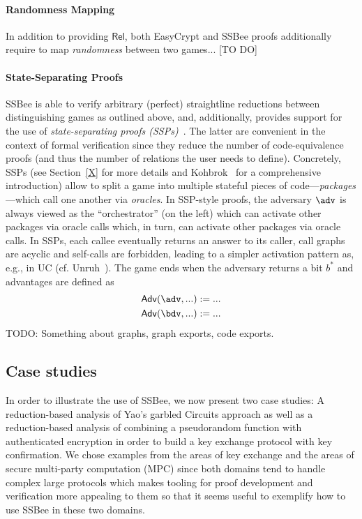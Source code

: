 \paragraph{Randomness Mapping}
In addition to providing $\mathsf{Rel}$, both EasyCrypt and SSBee proofs additionally require to
map \emph{randomness} between two games... [TO DO]

\paragraph{State-Separating Proofs}
SSBee is able to verify arbitrary (perfect) straightline reductions between distinguishing games as outlined above, and, additionally, provides support for the use of \emph{state-separating proofs (SSPs)}~\cite{X}. The latter are convenient in the context of formal verification since they reduce the
number of code-equivalence proofs (and thus the number of relations the user needs to define). Concretely, SSPs (see Section~\ref{X} for more details and Kohbrok~\cite{X} for a comprehensive introduction) allow to split a game into multiple stateful
pieces of code---\emph{packages}---which call one another via \emph{oracles}. In SSP-style proofs,
the adversary $\adv$ is always viewed as the ``orchestrator'' (on the left) which can activate other
packages via oracle calls which, in turn, can activate other packages via oracle calls. In SSPs,
each callee eventually returns an answer to its caller, call graphs are acyclic and self-calls are forbidden, leading to a simpler activation pattern as, e.g., in UC (cf. Unruh~\cite{X}). The game ends when the adversary returns a bit $b^*$ and advantages are defined as 
\begin{align*}
\mathsf{Adv}(\adv,...)&:=...\\
\mathsf{Adv}(\bdv,...)&:=...
\end{align*}
TODO: Something about graphs, graph exports, code exports.



\subsection{Case studies}\label{sec:casestudies}
In order to illustrate the use of SSBee, we now present two
case studies: A reduction-based analysis of Yao's garbled Circuits approach
as well as a reduction-based analysis of combining a pseudorandom function
with authenticated encryption in order to build a key exchange protocol with
key confirmation. We chose examples from the areas of key exchange and the
areas of secure multi-party computation (MPC) since both domains tend to
handle complex large protocols which makes tooling for proof development
and verification more appealing to them so that it seems useful to exemplify
how to use SSBee in these two domains.


